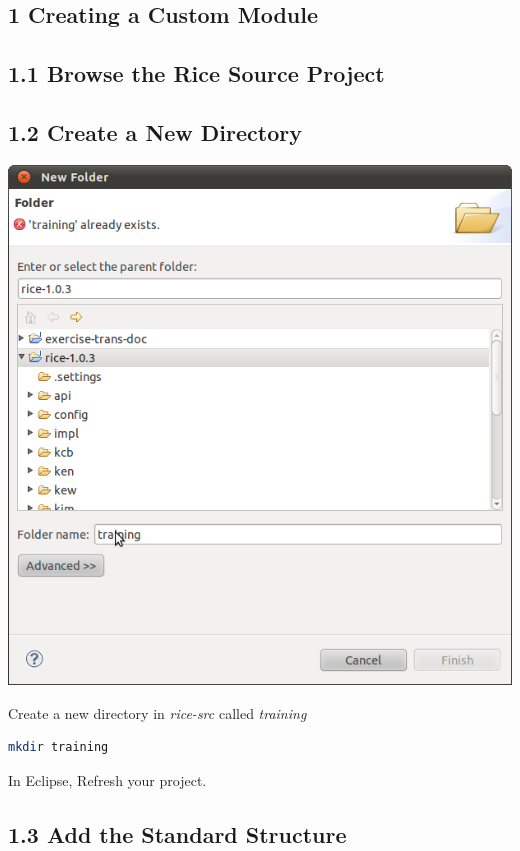 \subsection*{1 Creating a Custom Module}

\subsection*{1.1 Browse the Rice Source Project}

\subsection*{1.2 Create a New Directory}
\includegraphics[width=\textwidth]{images/Screenshot.png}

Create a new directory in \emph{rice-src} called \emph{training}
\begin{lstlisting}[language=bash,basicstyle=\scriptsize,backgroundcolor=\color{ubergray},caption={Directory
    creation for Linux users},frame=single,breaklines=true]
mkdir training
\end{lstlisting}
In Eclipse, Refresh your project.

\subsection*{1.3 Add the Standard Structure}
